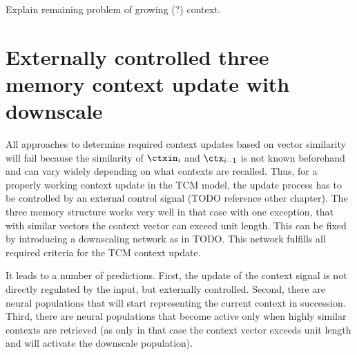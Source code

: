 Explain remaining problem of growing (?) context.

\section{Externally controlled three memory context update with downscale}
All approaches to determine required context updates based on vector similarity will fail because the similarity of $\ctxin_i$ and $\ctx_{i-1}$ is not known beforehand and can vary widely depending on what contexts are recalled.
Thus, for a properly working context update in the TCM model, the update process has to be controlled by an external control signal (TODO reference other chapter).
The three memory structure works very well in that case with one exception, that with similar vectors the context vector can exceed unit length.
This can be fixed by introducing a downscaling network as in TODO\@.
This network fulfills all required criteria for the TCM context update.

It leads to a number of predictions.
First, the update of the context signal is not directly regulated by the input, but externally controlled. Second, there are neural populations that will start representing the current context in succession. Third, there are neural populations that become active only when highly similar contexts are retrieved (as only in that case the context vector exceeds unit length and will activate the downscale population).
